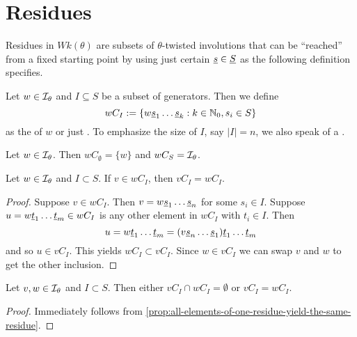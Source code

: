 \section{Residues}
\label{sec:twisted-involutions-residues}

Residues in $Wk(\theta)$ are subsets of $\theta$-twisted involutions that can be ``reached'' from a fixed starting point by using just certain $\underline{s} \in \underline{S}$ as the following definition specifies.

\begin{defi}
	Let $w \in \mathcal{I}_{\theta}$ and $I \subseteq S$ be a subset of generators. Then we define
	$$ wC_I := \{ w \underline{s}_1 \ldots \underline{s}_k : k \in \mathbb{N}_0, s_i \in S \} $$
	as the  of $w$ or just . To emphasize the size of $I$, say $|I| = n$, we also speak of a .
\end{defi}

\begin{exam}
	Let $w \in \mathcal{I}_{\theta}$. Then $wC_\emptyset = \{ w \}$ and $wC_S = \mathcal{I}_{\theta}$.
\end{exam}

\begin{prop}
	Let $w \in \mathcal{I}_{\theta}$ and $I \subset S$. If $v \in wC_I$, then $vC_I = wC_I$.

	\begin{proof}
		Suppose $v \in wC_I$. Then $v = w \underline{s}_1 \ldots \underline{s}_n$ for some $s_i \in I$. Suppose $u = w \underline{t}_1 \ldots \underline{t}_m \in wC_I$ is any other element in $wC_I$ with $t_i \in I$. Then
		$$ u = w \underline{t}_1 \ldots \underline{t}_m = (v \underline{s}_n \ldots \underline{s}_1) \underline{t}_1 \ldots \underline{t}_m $$
		and so $u \in vC_I$. This yields $wC_I \subset vC_I$. Since $w \in vC_I$ we can swap $v$ and $w$ to get the other inclusion.
	\end{proof}
\end{prop}

\begin{coro}
	Let $v, w \in \mathcal{I}_{\theta}$ and $I \subset S$. Then either $vC_I \cap wC_I = \emptyset$ or $vC_I = wC_I$.

	\begin{proof}
		Immediately follows from \ref{prop:all-elements-of-one-residue-yield-the-same-residue}.
	\end{proof}
\end{coro}

